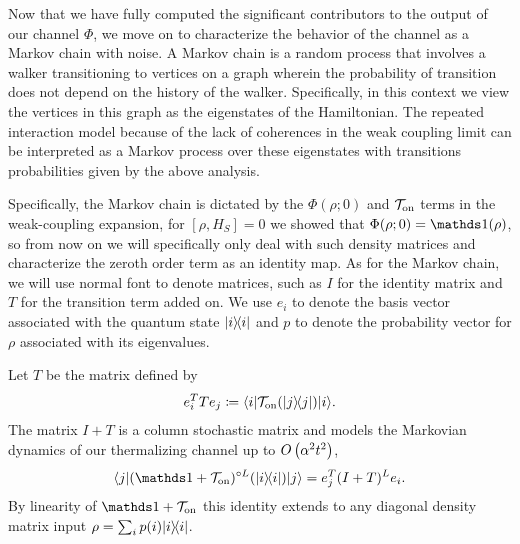 Now that we have fully computed the significant contributors to the output of our channel $\Phi$, we move on to characterize the behavior of the channel as a Markov chain with noise. 
A Markov chain is a random process that involves a walker transitioning to vertices on a graph wherein the probability of transition does not depend on the history of the walker.  Specifically, in this context we view the vertices in this graph as the eigenstates of the Hamiltonian.  The repeated interaction model because of the lack of coherences in the weak coupling limit can be interpreted as a Markov process over these eigenstates with transitions probabilities given by the above analysis. 

Specifically, the Markov chain is dictated by the $\Phi(\rho; 0)$ and $\mathcal{T}_{\rm on}$ terms in the weak-coupling expansion, for $[\rho, H_S] = 0$ we showed that $\Phi(\rho; 0) = \identity(\rho)$, so from now on we will specifically only deal with such density matrices and characterize the zeroth order term as an identity map. As for the Markov chain, we will use normal font to denote matrices, such as $I$ for the identity matrix and $T$ for the transition term added on. We use $e_i$ to denote the basis vector associated with the quantum state $| i\rangle\! \langle i|$ and $p$ to denote the probability vector for $\rho$ associated with its eigenvalues.
\begin{lemma} \label{lem:quantum_to_classical}
    Let $T$ be the matrix defined by 
    \begin{equation}
        e_i^T T e_j \coloneqq \langle i| \mathcal{T}_{\rm on}(| j\rangle\! \langle j|) |i\rangle.
    \end{equation}
    The matrix $I + T$ is a column stochastic matrix and models the Markovian dynamics of our thermalizing channel up to $O\left( \alpha^2 t^2 \right)$,
    \begin{equation}
        \bra{j} (\identity + \mathcal{T}_{\on})^{\circ L} (\ketbra{i}{i}) \ket{j} = e_j^T (I + T)^L e_i.
    \end{equation}
    By linearity of $\identity + \mathcal{T}_{\on}$ this identity extends to any diagonal density matrix input $\rho = \sum_i p(i) | i\rangle\! \langle i|$.
\end{lemma}
